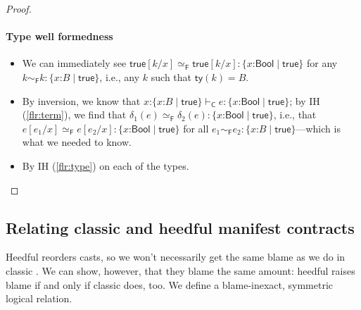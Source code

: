 \documentclass[9pt]{extarticle}
\newcommand{\ottnt}[1]{\mathit{#1}}
\newcommand{\ottsym}[1]{#1}
\begin{document}
{\begin{lemma}
\begin{proof}
{    \paragraph{Type well formedness \fbox{$ \mathord{  \vdash _{  \mathsf{C}  } }~ \ottnt{T} $}}
    \begin{itemize}
    \item[\WF{Base}] We can immediately see $   \mathsf{true}   [  \ottnt{k} / \mathit{x}  ]    \simeq _{  \mathsf{F}  }    \mathsf{true}   [  \ottnt{k} / \mathit{x}  ]   :   \{ \mathit{x} \mathord{:}  \mathsf{Bool}  \mathrel{\mid}  \mathsf{true}  \}  $ for any $ \ottnt{k}   \sim _{  \mathsf{F}  }  \ottnt{k}  :   \{ \mathit{x} \mathord{:} \ottnt{B} \mathrel{\mid}  \mathsf{true}  \}  $, i.e., any
      $\ottnt{k}$ such that $ \mathsf{ty} ( \ottnt{k} )   \ottsym{=}  \ottnt{B}$.
    \item[\WF{Refine}] By inversion, we know that $  \mathit{x} \mathord{:}  \{ \mathit{x} \mathord{:} \ottnt{B} \mathrel{\mid}  \mathsf{true}  \}     \vdash _{  \mathsf{C}  }  \ottnt{e}  :   \{ \mathit{x} \mathord{:}  \mathsf{Bool}  \mathrel{\mid}  \mathsf{true}  \}  $; by IH (\ref{flr:term}), we find that
      $ \delta_{{\mathrm{1}}}  \ottsym{(}  \ottnt{e}  \ottsym{)}   \simeq _{  \mathsf{F}  }  \delta_{{\mathrm{2}}}  \ottsym{(}  \ottnt{e}  \ottsym{)}  :   \{ \mathit{x} \mathord{:}  \mathsf{Bool}  \mathrel{\mid}  \mathsf{true}  \}  $, i.e., that
      $  \ottnt{e}  [  \ottnt{e_{{\mathrm{1}}}} / \mathit{x}  ]    \simeq _{  \mathsf{F}  }   \ottnt{e}  [  \ottnt{e_{{\mathrm{2}}}} / \mathit{x}  ]   :   \{ \mathit{x} \mathord{:}  \mathsf{Bool}  \mathrel{\mid}  \mathsf{true}  \}  $ for all $ \ottnt{e_{{\mathrm{1}}}}   \sim _{  \mathsf{F}  }  \ottnt{e_{{\mathrm{2}}}}  :   \{ \mathit{x} \mathord{:} \ottnt{B} \mathrel{\mid}  \mathsf{true}  \}  $---which is what we needed to know.
    \item[\WF{Fun}] By IH (\ref{flr:type}) on each of the types.
    \end{itemize}

    \fi}
  \end{proof}
\end{lemma}

\subsection{Relating classic and heedful manifest contracts}
\label{sec:heedfullr}

Heedful \lambdah reorders casts, so we won't necessarily get the same
blame as we do in classic \lambdah. We can show, however, that they
blame the same amount: heedful \lambdah raises blame if and only if
classic \lambdah does, too. We define a blame-inexact, symmetric
logical relation.

}
\end{document}
